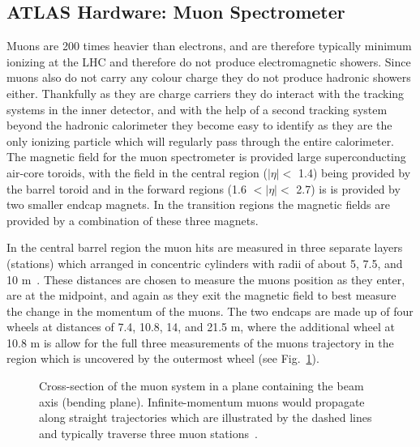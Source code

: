 \subsection{ATLAS Hardware: Muon Spectrometer}
Muons are 200 times heavier than electrons, and are therefore typically minimum ionizing at the LHC and therefore do not produce electromagnetic showers.  
Since muons also do not carry any colour charge they do not produce hadronic showers either.  
Thankfully as they are charge carriers they do interact with the tracking systems in the inner detector, and with the help of a second tracking system beyond the hadronic calorimeter they become easy to identify as they are the only ionizing particle which will regularly pass through the entire calorimeter.  
The magnetic field for the muon spectrometer is provided large superconducting air-core toroids, with the field in the central region ($\mid\eta\mid<$ 1.4) being provided by the barrel toroid and in the forward regions (1.6 $<\mid\eta\mid<$ 2.7) is is provided by two smaller endcap magnets.  
In the transition regions the magnetic fields are provided by a combination of these three magnets.  

In the central barrel region the muon hits are measured in three separate layers (stations) which arranged in concentric cylinders with radii of about 5, 7.5, and 10 m~\cite{MuonTDR}.  
These distances are chosen to measure the muons position as they enter, are at the midpoint, and again as they exit the magnetic field to best measure the change in the momentum of the muons.  
The two endcaps are made up of four wheels at distances of 7.4, 10.8, 14, and 21.5 m, where the additional wheel at 10.8 m is allow for the full three measurements of the muons trajectory in the region which is uncovered by the outermost wheel (see Fig.~\ref{MuonSpectroFig}).  

\begin{figure}[!ht]
  \begin{center}
  \end{center}
  \caption[Stopping power for positive muons in copper.]
      {\small Cross-section of the muon system in a plane containing the beam axis (bending plane). Infinite-momentum muons would propagate along straight trajectories which are illustrated by the dashed lines and typically traverse three muon stations~\cite{JOIATLAS}.}
  \label{MuonSpectroFig}
\end{figure}

